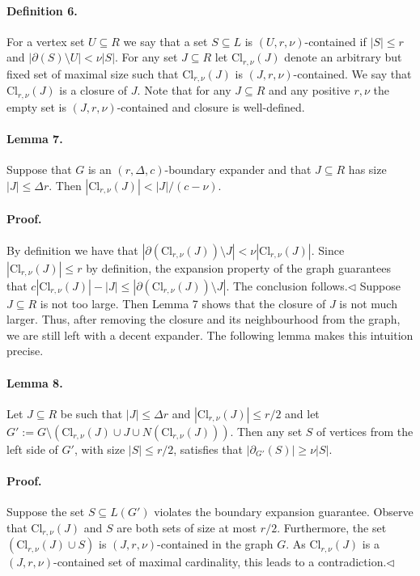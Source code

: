 \paragraph{Definition 6.} For a vertex set $U\subseteq R$ we say that a set $S\subseteq L$ is $(U,r,\nu)$-contained if $|S|\leq r$ and $|\partial(S)\setminus U|<\nu|S|$. For any set $J\subseteq R$ let $\mathrm{Cl}_{r,\nu}(J)$ denote an arbitrary but fixed set of maximal size such that $\mathrm{Cl}_{r,\nu}(J)$ is $(J,r,\nu)$-contained. We say that $\mathrm{Cl}_{r,\nu}(J)$ is a closure of $J$.
Note that for any $J\subseteq R$ and any positive $r,\nu$ the empty set is $(J,r,\nu)$-contained and closure is well-defined.
\paragraph{Lemma 7.} Suppose that $G$ is an $(r,\Delta,c)$-boundary expander and that $J\subseteq R$ has size $|J|\leq\Delta r$. Then $|\mathrm{Cl}_{r,\nu}(J)|<|J|/(c-\nu)$.
\paragraph{Proof.} By definition we have that $|\partial(\mathrm{Cl}_{r,\nu}(J))\setminus J|<\nu|\mathrm{Cl}_{r,\nu}(J)|$. Since $|\mathrm{Cl}_{r,\nu}(J)|\leq r$ by definition, the expansion property of the graph guarantees that $c|\mathrm{Cl}_{r,\nu}(J)|-|J|\leq|\partial(\mathrm{Cl}_{r,\nu}(J))\setminus J|$. The conclusion follows.\hfill$\triangleleft$
Suppose $J\subseteq R$ is not too large. Then Lemma 7 shows that the closure of $J$ is not much larger. Thus, after removing the closure and its neighbourhood from the graph, we are still left with a decent expander. The following lemma makes this intuition precise.
\paragraph{Lemma 8.} Let $J\subseteq R$ be such that $|J|\leq\Delta r$ and $|\mathrm{Cl}_{r,\nu}(J)|\leq r/2$ and let $G':=G\setminus(\mathrm{Cl}_{r,\nu}(J)\cup J\cup N(\mathrm{Cl}_{r,\nu}(J)))$. Then any set $S$ of vertices from the left side of $G'$, with size $|S|\leq r/2$, satisfies that $|\partial_{G'}(S)|\geq\nu|S|$.
\paragraph{Proof.} Suppose the set $S\subseteq L(G')$ violates the boundary expansion guarantee. Observe that $\mathrm{Cl}_{r,\nu}(J)$ and $S$ are both sets of size at most $r/2$. Furthermore, the set $(\mathrm{Cl}_{r,\nu}(J)\cup S)$ is $(J,r,\nu)$-contained in the graph $G$. As $\mathrm{Cl}_{r,\nu}(J)$ is a $(J,r,\nu)$-contained set of maximal cardinality, this leads to a contradiction.\hfill$\triangleleft$
